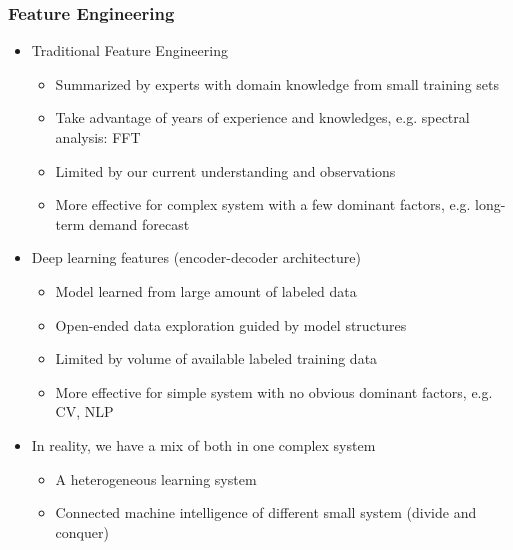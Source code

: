 \documentclass[aspectratio=169,xcolor=x11names,table]{beamer}
\begin{document}
\begin{frame}
	\frametitle{Feature Engineering}
	\begin{itemize}
		\item<1> Traditional Feature Engineering
			\begin{itemize}
				\item Summarized by experts with domain knowledge from small training sets
				\item Take advantage of years of experience and knowledges, e.g. spectral analysis: FFT
				\item Limited by our current understanding and observations
				\item More effective for complex system with a few dominant factors, e.g. long-term demand forecast
			\end{itemize}
		\item<2> Deep learning features (encoder-decoder architecture)
			\begin{itemize}
				\item Model learned from large amount of labeled data
				\item Open-ended data exploration guided by model structures
				\item Limited by volume of available labeled training data
				\item More effective for simple system with no obvious dominant factors, e.g. CV, NLP
			\end{itemize}
		\item<3> In reality, we have a mix of both in one complex system
			\begin{itemize}
				\item A heterogeneous learning system
				\item Connected machine intelligence of different small system (divide and conquer)
			\end{itemize}
	\end{itemize}
\end{frame}
\end{document}
